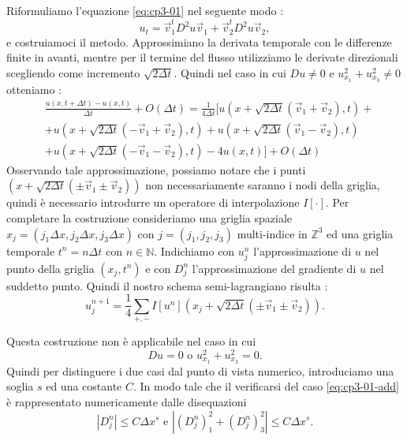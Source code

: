 Riformuliamo l'equazione \eqref{eq:cp3-01} nel seguente modo :
\begin{equation}
u_t=\vec{v}_1^tD^2u\vec{v}_1 + \vec{v}_2^tD^2u\vec{v}_2,
\end{equation}
e costruiamoci il metodo.
Approssimiano la derivata temporale con le differenze finite in avanti, mentre per il termine del flusso utilizziamo le derivate direzionali scegliendo come incremento $\sqrt{2\Delta t}$.
Quindi nel caso in cui $Du \ne 0$ e $u_{x_1}^2+u_{x_3}^2\ne 0$ otteniamo :
\[
\begin{split}
&\frac{u(x,t+\Delta t)-u(x,t)}{\Delta t} +O(\Delta t)= \frac{1}{4\Delta t}\bigl[u(x+\sqrt{2\Delta t}(\vec{v}_1+\vec{v}_2),t) +\\
& +u(x+\sqrt{2\Delta t}(-\vec{v}_1+\vec{v}_2),t) + u(x+\sqrt{2\Delta t}(\vec{v}_1-\vec{v}_2),t) \\
& + u(x+\sqrt{2\Delta t}(-\vec{v}_1-\vec{v}_2),t) - 4u(x,t)\bigr] + O(\Delta t)
\end{split}
\]
Osservando tale approssimazione, possiamo notare che i punti $(x + \sqrt{2\Delta t}(\pm\vec{v}_1 \pm\vec{v}_2))$ non necessariamente saranno i nodi della griglia, quindi è necessario introdurre un operatore di interpolazione $I[\cdot]$.
Per completare la costruzione consideriamo una griglia spaziale $x_j=(j_1\Delta x,j_2\Delta x,j_3\Delta x)$ con $j=(j_1,j_2,j_3)$ multi-indice in $\mathbb{Z}^3$ ed una griglia temporale $t^n=n\Delta t$ con $n\in\mathbb{N}$.
Indichiamo con $u_j^n$ l'approssimazione di $u$ nel punto della griglia $(x_j,t^n)$ e con $D_j^n$ l'approssimazione del gradiente di $u$ nel suddetto punto. Quindi il nostro schema semi-lagrangiano risulta :
\begin{equation}
\label{eq:cp3-02}
u_j^{n+1} = \frac{1}{4}\sum_{+,-}I[u^n](x_j+\sqrt{2\Delta t}(\pm\vec{v}_1\pm\vec{v}_2)).
\end{equation} 
\begin{osservazione}
Questa costruzione non è applicabile nel caso in cui 
\begin{equation}
\label{eq:cp3-01-add}
Du = 0 \text{ o } u_{x_1}^2+u_{x_3}^2 = 0. 
\end{equation}
Quindi per distinguere i due casi dal punto di vista numerico, introduciamo una soglia $s$ ed una costante $C$. In modo tale che il verificarsi del caso \eqref{eq:cp3-01-add} è rappresentato numericamente dalle disequazioni
\begin{equation}
\label{eq:cp3-sc3-1-01}
|D_j^n|\le C\Delta x^s\text{ e }|(D_j^n)_1^2+(D_j^n)_3^2|\le C\Delta x^s.
\end{equation}
\end{osservazione}
